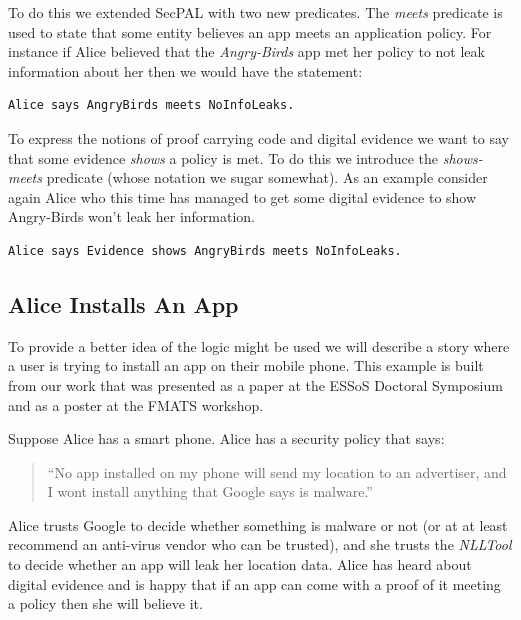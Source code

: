\documentclass[a4paper,sfsidenotes]{tufte-book}
\begin{document}
To do this we extended SecPAL with two new predicates.  The \emph{meets}
predicate is used to state that some entity believes an app meets an application
policy.  For instance if Alice believed that the \emph{Angry-Birds} app met her
policy to not leak information about her then we would have the statement:

\begin{lstlisting}[language=SecPAL]
Alice says AngryBirds meets NoInfoLeaks.
\end{lstlisting}

To express the notions of proof carrying code\cite{Necula:1996tr} and digital
evidence we want to say that some evidence \emph{shows} a policy is met.  To do
this we introduce the \emph{shows-meets} predicate (whose notation we sugar
somewhat).  As an example consider again Alice who this time has managed to get
some digital evidence to show Angry-Birds won't leak her information.

\begin{lstlisting}[language=SecPAL]
Alice says Evidence shows AngryBirds meets NoInfoLeaks.
\end{lstlisting}

\subsection{Alice Installs An App}

To provide a better idea of the logic might be used we will describe a story
where a user is trying to install an app on their mobile phone.  This example is
built from our work that was presented as a paper at the ESSoS Doctoral
Symposium\cite{Hallett:2014un} and as a poster at the FMATS workshop.

Suppose Alice has a smart phone.  Alice has a security policy that says:

\begin{quote}
    ``No app installed on my phone will send my location to an advertiser, and I
      wont install anything that Google says is malware.''
\end{quote}

Alice trusts Google to decide whether something is malware or not (or at at
least recommend an anti-virus vendor who can be trusted), and she trusts the
\emph{NLLTool} to decide whether an app will leak her location
data.  Alice has heard about digital evidence and is happy that if an app can
come with a proof of it meeting a policy then she will believe it.
\end{document}
